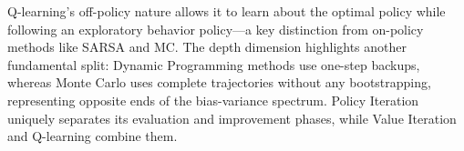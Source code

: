 Q-learning's off-policy nature allows it to learn about the optimal policy while following an exploratory behavior policy—a key distinction from on-policy methods like SARSA and MC. The depth dimension highlights another fundamental split: Dynamic Programming methods use one-step backups, whereas Monte Carlo uses complete trajectories without any bootstrapping, representing opposite ends of the bias-variance spectrum. Policy Iteration uniquely separates its evaluation and improvement phases, while Value Iteration and Q-learning combine them.
